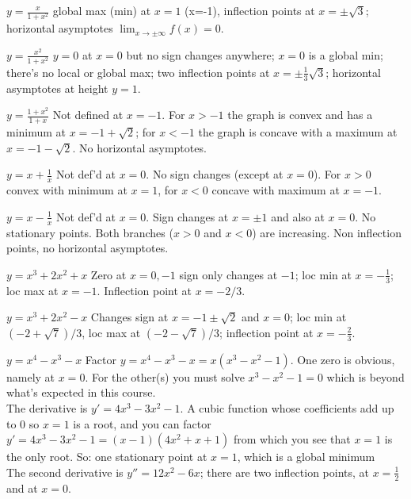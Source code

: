 \begin{multicols}{2}
\problem $\displaystyle y=\frac{x}{1+x^2}$ %
\answer %
global max (min) at $x=1$ (x=-1), inflection points at $x=\pm\surd3$;
horizontal asymptotes $\lim_{x\to \pm\infty}f(x) = 0$.
\endanswer




\problem $\displaystyle y=\frac{x^2}{1+x^2}$ %
\answer %
$y=0$ at $x=0$ but no sign changes anywhere;  $x=0$ is a global min;
there's no local or global max;  two inflection points at
$x=\pm\frac13\surd3$; horizontal asymptotes at height $y=1$.
\endanswer




\problem $\displaystyle y=\frac{1+x^2}{1+x}$ %
\answer %
Not defined at $x=-1$.  For $x>-1$ the graph is convex and has a
minimum at $x=-1+\surd2$;  for $x<-1$ the graph is concave with a
maximum at $x=-1-\surd2$.  No horizontal asymptotes.
\endanswer




\problem $\displaystyle y=x+\frac1x$ %
\answer %
Not def'd at $x=0$. No sign changes (except at $x=0$).
For $x>0$ convex with minimum at $x=1$, for $x<0$ concave
with maximum at $x=-1$.
\endanswer




\problem $\displaystyle y=x-\frac1x$ %
\answer %
Not def'd at $x=0$. Sign changes at $x=\pm1$ and also at $x=0$.
No stationary points.  Both branches ($x>0$ and $x<0$) are
increasing.  Non inflection points, no horizontal asymptotes.
\endanswer




\problem $\displaystyle y=x^3+2x^2+x$ %
\answer %
Zero at $x=0, -1 $ sign only changes at $-1$;  loc min at
$x=-\frac13$; loc max at $x=-1$.  Inflection point at $x=-2/3$.
\endanswer




\problem $\displaystyle y=x^3+2x^2-x$ %
\answer %
Changes sign at $x=-1\pm\surd2$ and $x=0$; loc min at
$(-2+\surd7)/3$, loc max at $(-2-\surd7)/3$; inflection point at
$x=-\frac23$.
\endanswer




\problem $\displaystyle y=x^4-x^3-x$ %
\answer %
Factor $y=x^4-x^3-x=x(x^3-x^2-1)$.  One zero is obvious, namely
at $x=0$.  For the other(s) you must solve $x^3-x^2-1=0$ which is
beyond what's expected in this course.\\
The derivative is $y'=4x^3-3x^2-1$.  A cubic function whose
coefficients add up to 0 so $x=1$ is a root, and you can factor
$y'=4x^3-3x^2-1= (x-1)(4x^2+x+1)$ from which you see that $x=1$
is the only root.  So: one stationary point at $x=1$, which is a
global minimum\\
The second derivative is $y''=12x^2-6x$; there are two inflection
points, at $x=\frac12$ and at $x=0$.
\endanswer





\end{multicols}

